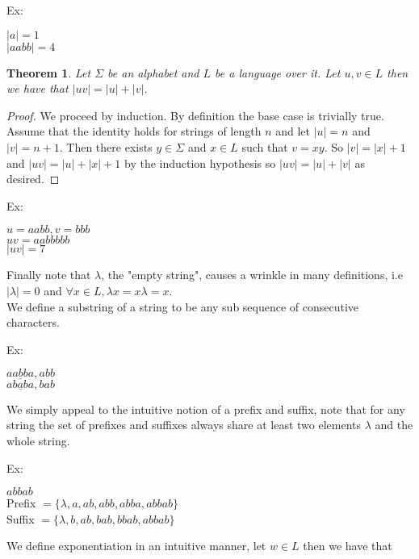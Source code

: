 \documentclass[11pt]{exam}
\newtheorem{theorem}{Theorem}[section]
\begin{document}
Ex: 
\begin{center}
$|a| = 1$\\
$|aabb| = 4$
\end{center}


\begin{theorem}
Let $\Sigma$ be an alphabet and $L$ be a language over it. Let $u,v \in L$ then we have that $|uv| = |u| + |v|$.
\end{theorem}
\begin{proof}
 We proceed by induction. By definition the base case is trivially true. Assume that the identity holds for strings of length $n$ and let $|u| = n$ and $|v| = n+1$. Then there exists $y \in \Sigma$ and $x \in L$ such that $v = xy$. So $|v| = |x| + 1$ and $|uv| = |u| + |x| + 1$ by the induction hypothesis so $|uv| = |u| + |v|$ as desired.
\end{proof}
   

Ex:
\begin{center}
$u = aabb, v = bbb$\\
$uv = aabbbbb$\\
$|uv| = 7$
\end{center}

Finally note that $\lambda$, the "empty string", causes a wrinkle in many definitions, i.e $|\lambda| = 0$ and $\forall x \in L, \lambda x = x \lambda = x$. \\


We define a substring of a string to be any sub sequence of consecutive characters.

Ex:
\begin{center}
$a \underline{abb} a, abb$\\
$a \underline{bab} a, bab$\\
\end{center}

We simply appeal to the intuitive notion of a prefix and suffix, note that for any string the set of prefixes and suffixes always share at least two elements $\lambda$ and the whole string.

Ex:
\begin{center}
$abbab$\\
Prefix $= \{\lambda, a, ab, abb, abba, abbab \}$\\
Suffix $= \{\lambda, b, ab, bab, bbab, abbab \}$\\
\end{center}


We define exponentiation in an intuitive manner, let $w \in L$ then we have that
\end{document}
